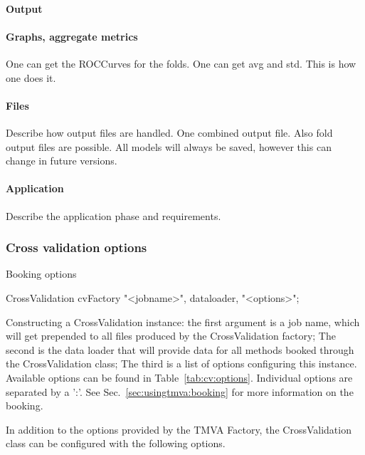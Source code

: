 \paragraph{Output}

\paragraph{Graphs, aggregate metrics}
One can get the ROCCurves for the folds. One can get avg and std.
This is how one does it.

\paragraph{Files}
Describe how output files are handled. One combined output file. Also fold output files are possible.
All models will always be saved, however this can change in future versions.

\paragraph{Application}
Describe the application phase and requirements.

\subsubsection{Cross validation options}
Booking options
\begin{codeexample}
\begin{tmvacode}
CrossValidation cvFactory {"<jobname>", dataloader, "<options>"};
\end{tmvacode}
\caption[.]{\codeexampleCaptionSize Constructing a CrossValidation instance:
   the first argument is a job name, which will get prepended to all files
   produced by the CrossValidation factory; The second is the data loader that
   will provide data for all methods booked through the CrossValidation class;
   The third is a list of options configuring this instance. Available options
   can be found in Table~\ref{tab:cv:options}.
   Individual options are separated by a ':'. See
   Sec.~\ref{sec:usingtmva:booking} for more information on the booking.}
\end{codeexample}


In addition to the options provided by the TMVA Factory, the CrossValidation class can be configured with the following options.


